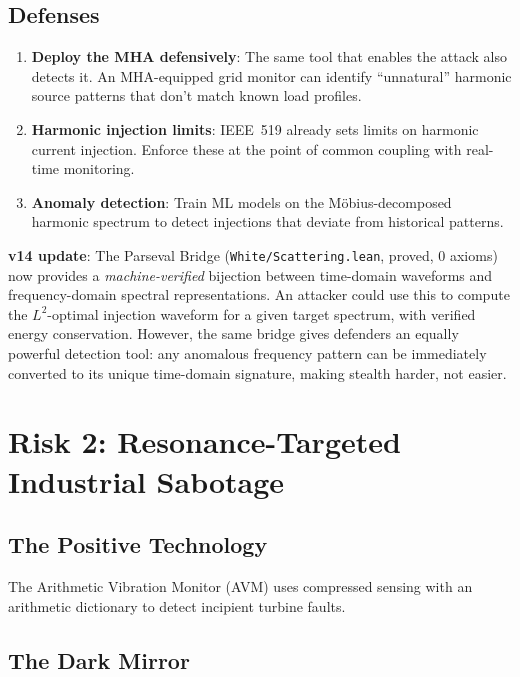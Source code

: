 \documentclass[11pt,a4paper]{article}
\begin{document}
\subsection{Defenses}

\begin{enumerate}
  \item \textbf{Deploy the MHA defensively}: The same tool that
    enables the attack also detects it. An MHA-equipped grid monitor
    can identify ``unnatural'' harmonic source patterns that don't
    match known load profiles.
  \item \textbf{Harmonic injection limits}: IEEE~519 already sets
    limits on harmonic current injection. Enforce these at the
    point of common coupling with real-time monitoring.
  \item \textbf{Anomaly detection}: Train ML models on the
    M\"obius-decomposed harmonic spectrum to detect injections that
    deviate from historical patterns.
\end{enumerate}

\textbf{v14 update}: The Parseval Bridge
(\texttt{White/Scattering.lean}, proved, 0 axioms) now provides a
\emph{machine-verified} bijection between time-domain waveforms and
frequency-domain spectral representations. An attacker could use this
to compute the $L^2$-optimal injection waveform for a given target
spectrum, with verified energy conservation. However, the same bridge
gives defenders an equally powerful detection tool: any anomalous
frequency pattern can be immediately converted to its unique
time-domain signature, making stealth harder, not easier.

\section{Risk 2: Resonance-Targeted Industrial Sabotage}
\label{sec:vibration}

\subsection{The Positive Technology}

The Arithmetic Vibration Monitor (AVM) uses compressed sensing with
an arithmetic dictionary to detect incipient turbine faults.

\subsection{The Dark Mirror}
\end{document}
